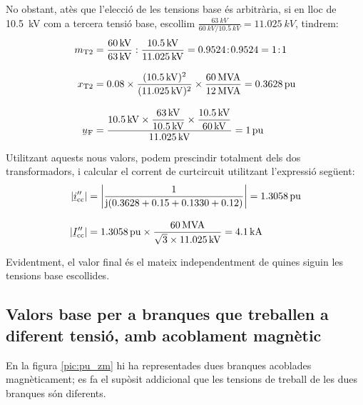 \begin{exemple}
     No obstant, at\`{e}s que l'elecci\'{o} de les tensions base \'{e}s
     arbitr\`{a}ria, si en lloc de \SI{10,5}{kV} com a tercera tensi\'{o} base,
     escollim
     $\frac{\SI{63}{kV}}{\SI{60}{kV} / \SI{10,5}{kV}}=\SI{11,025}{kV}$,
     tindrem:
    \begin{align*}
       m\ped{T2} &= \frac{60\unit{kV}}{63\unit{kV}} : \frac{\SI{10,5}{kV}}{\SI{11,025}{kV}}
       = \num{0,9524}\!:\!\num{0,9524} = 1\!:\!1 \\[3mm]
       x\ped{T2} &= \num{0,08} \times \frac{(\SI{10,5}{kV})^2}{(\SI{11,025}{kV})^2 } \times
       \frac{60\unit{MVA}}{12\unit{MVA}}  = \SI{0,3628}{pu}\\[3mm]
       \cmplx{u}\ped{F} &= \frac{\SI{10,5}{kV} \times \dfrac{63\unit{kV}}{\SI{10,5}{kV}} \times
       \dfrac{\SI{10,5}{kV}}{60\unit{kV}}}{\SI{11,025}{kV}} = 1\unit{pu}
    \end{align*}

    Utilitzant aquests nous valors, podem prescindir totalment dels dos
    transformadors, i calcular el corrent de curtcircuit utilitzant
    l'expressi\'{o} seg\"{u}ent:
    \begin{align*}
    |\cmplx{i}''\ped{cc}| &= \left| \frac{1}{\ju ( \num{0,3628} + \num{0,15} +
    \num{0,1330} + \num{0,12} )} \right| = \SI{1,3058}{pu} \\[3mm]
    |\cmplx{I}''\ped{cc}| &=
    \SI{1,3058}{pu}\times\frac{60\unit{MVA}}{\sqrt{3}\times \SI{11,025}{kV}} =
    \SI{4,1}{kA}
    \end{align*}

    Evidentment, el valor final \'{e}s el mateix independentment de quines
    siguin les tensions base escollides.
\end{exemple}

\subsection{Valors base per a branques que treballen a diferent tensi\'{o}, amb acoblament magn\`{e}tic}

En la figura \vref{pic:pu_zm} hi ha representades dues branques acoblades magn\`{e}ticament; es fa el sup\`{o}sit addicional que les tensions de treball de les dues branques s\'{o}n diferents.

\begin{center}
    
    \label{pic:pu_zm}
\end{center}

